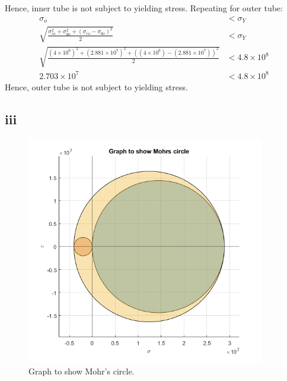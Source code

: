 \documentclass[11pt]{article}
\numberwithin{equation}{section}
\begin{document}
Hence, inner tube is not subject to yielding stress. Repeating for outer tube:
\begin{align}
    \sigma_o &< \sigma_Y\\
    \sqrt{\frac{\sigma_{ro}^2 + \sigma_{\theta o}^2 + \left(\sigma_{ro} - \sigma_{\theta o}\right)^2}{2}} &< \sigma_Y\\
    \sqrt{\frac{(4\times10^6)^2 + (2.881\times 10^7)^2 + \left((4\times 10^6) - (2.881\times 10^7)\right)^2}{2}} &< 4.8\times 10^8\\
    2.703\times 10^7 &< 4.8 \times 10^8
\end{align}
Hence, outer tube is not subject to yielding stress.
\subsection{iii}

\begin{figure}[H]
    \centering
    \includegraphics[height = 10cm]{./img/q2iii1.png}
    \caption{Graph to show Mohr's circle.}
    \label{fig:q2iii}
\end{figure}
\end{document}
